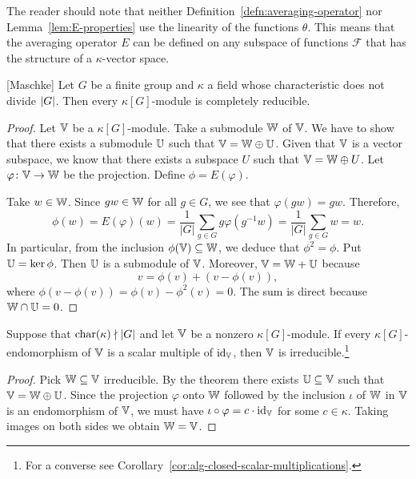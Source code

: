 \begin{rem}\label{rem:E-generalization}
    The reader should note that neither Definition~\ref{defn:averaging-operator} nor Lemma~\ref{lem:E-properties} use the linearity of the functions $\theta$. This means that the averaging operator $E$ can be defined on any subspace of functions $\mathcal F$ that has the structure of a $\kappa$-vector space.
\end{rem}

\begin{thm}\label{thm:maschke} {\rm[Maschke]}
    Let\/ $G$ be a finite group and\/ $\kappa$ a field whose characteristic does not divide\/ $\left\vert{G}\right\vert$. Then every\/ $\kappa[G]$-module is completely reducible.
\end{thm}

\begin{proof}
    Let $\mathbb V$ be a $\kappa[G]$-module. Take a submodule $\mathbb W$ of $\mathbb V$. We have to show that there exists a submodule $\mathbb U$ such that $\mathbb V=\mathbb W\oplus\mathbb U$. Given that $\mathbb V$ is a vector subspace, we know that there exists a subspace $U$ such that $\mathbb V=\mathbb W\oplus U$. Let $\varphi\colon\mathbb V\to \mathbb W$ be the projection. Define $\phi=E(\varphi)$.

    Take $w\in\mathbb W$. Since $gw\in\mathbb W$ for all $g\in G$, we see that $\varphi(gw)=gw$. Therefore,
    $$
        \phi(w)= E(\varphi)(w) = \frac1{|G|}\sum_{g\in G}
                g\varphi(g^{-1}w)
            = \frac1{|G|}\sum_{g\in G}w = w.
    $$
    In particular, from the inclusion $\phi(\mathbb V)\subseteq\mathbb W$, we deduce that $\phi^2=\phi$. Put $\mathbb U=\ker\phi$. Then $\mathbb U$ is a submodule of $\mathbb V$. Moreover, $\mathbb V=\mathbb W+\mathbb U$ because
    $$
        v = \phi(v) + (v-\phi(v)),
    $$
    where $\phi(v-\phi(v))=\phi(v)-\phi^2(v)=0$. The sum is direct because $\mathbb W\cap\mathbb U=0$.
\end{proof}

\begin{cor}\label{cor:schur-converse}
    Suppose that\/ $\operatorname{char}(\kappa)\nmid|G|$ and let $\mathbb V$ be a nonzero $\kappa[G]$-module. If every\/ $\kappa[G]$-endomorphism of\/ $\mathbb V$ is a scalar multiple of\/ $\operatorname{id}_\mathbb V$, then \/$\mathbb V$ is irreducible.\footnote{For a converse see Corollary~\ref{cor:alg-closed-scalar-multiplications}.}
\end{cor}

\begin{proof}
    Pick $\mathbb W\subseteq\mathbb V$ irreducible. By the theorem there exists $\mathbb U\subseteq\mathbb V$ such that $\mathbb V=\mathbb W\oplus\mathbb U$. Since the projection $\varphi$ onto $\mathbb W$ followed by the inclusion $\iota$ of $\mathbb W$ in $\mathbb V$ is an endomorphism of $\mathbb V$, we must have $\iota\circ\varphi=c\cdot\operatorname{id}_\mathbb V$ for some $c\in\kappa$. Taking images on both sides we obtain $\mathbb W=\mathbb V$.
\end{proof}



